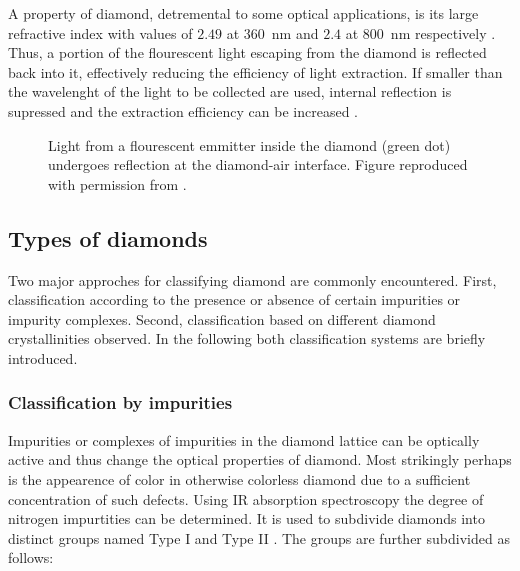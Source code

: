   A property of diamond, detremental to some optical applications, is its large refractive index with values of $2.49$ at \SI{360}{\nm} and $2.4$ at \SI{800}{\nm} respectively \cite{steinmetz::58}. Thus, a portion of the flourescent light escaping from the diamond is reflected back into it, effectively reducing the efficiency of light extraction. If \nds smaller than the wavelenght of the light to be collected are used, internal reflection is supressed and the extraction efficiency can be increased \cite{neu::49}.

  \begin{figure}[htp]
		\centering
		\caption{Light from a flourescent emmitter inside the diamond (green dot) undergoes reflection at the diamond-air interface. Figure reproduced with permission from \cite{neu::thesis}.}
		\label{fig::diamond_refraction}
	\end{figure}

  \subsection{Types of diamonds}

    Two major approches for classifying diamond are commonly encountered. First, classification according to the presence or absence of certain impurities or impurity complexes. Second, classification based on different diamond crystallinities observed. In the following both classification systems are briefly introduced.

    \subsubsection{Classification by impurities}

      Impurities or complexes of impurities in the diamond lattice can be optically active and thus change the optical properties of diamond. Most strikingly perhaps is the appearence of color in otherwise colorless diamond due to a sufficient concentration of such defects. Using IR absorption spectroscopy the degree of nitrogen impurtities can be determined. It is used to subdivide diamonds into distinct groups named Type I and Type II \cite{janine::148, janine::149}. The groups are further subdivided as follows:

